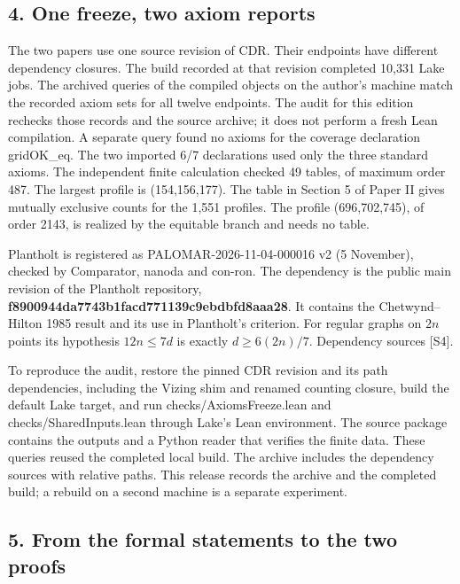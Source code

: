 \documentclass[english,11pt,a4paper]{article}
\begin{document}
\subsection{4. One freeze, two axiom reports}\label{one-freeze-two-axiom-reports}

The two papers use one source revision of CDR. Their endpoints have different dependency closures. The build recorded at that revision completed 10,331 Lake jobs. The archived queries of the compiled objects on the author's machine match the recorded axiom sets for all twelve endpoints. The audit for this edition rechecks those records and the source archive; it does not perform a fresh Lean compilation. A separate query found no axioms for the coverage declaration gridOK\_eq. The two imported 6/7 declarations used only the three standard axioms. The independent finite calculation checked 49 tables, of maximum order 487. The largest profile is (154,156,177). The table in Section 5 of Paper II gives mutually exclusive counts for the 1,551 profiles. The profile (696,702,745), of order 2143, is realized by the equitable branch and needs no table.

Plantholt is registered as PALOMAR-2026-11-04-000016 v2 (5 November), checked by Comparator, nanoda and con-ron. The dependency is the public main revision of the Plantholt repository, \textbf{f8900944da\allowbreak{}7743b1facd\allowbreak{}771139c9eb\allowbreak{}dbfd8aaa28}. It contains the Chetwynd--Hilton 1985 result and its use in Plantholt's criterion. For regular graphs on \(2n\) points its hypothesis \(12n\le7d\) is exactly \(d\ge6(2n)/7\). Dependency sources {[}S4{]}.

To reproduce the audit, restore the pinned CDR revision and its path dependencies, including the Vizing shim and renamed counting closure, build the default Lake target, and run checks/AxiomsFreeze.lean and checks/SharedInputs.lean through Lake's Lean environment. The source package contains the outputs and a Python reader that verifies the finite data. These queries reused the completed local build. The archive includes the dependency sources with relative paths. This release records the archive and the completed build; a rebuild on a second machine is a separate experiment.

\subsection{5. From the formal statements to the two proofs}\label{from-the-formal-statements-to-the-two-proofs}
\end{document}
